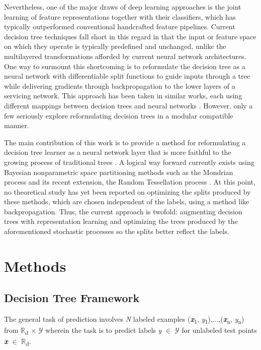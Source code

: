 \documentclass[a4paper,11pt,final]{article}
\begin{document}
Nevertheless, one of the major draws of deep learning approaches is the joint learning of feature representations together with their classifiers, which has typically outperformed conventional handcrafted feature pipelines. Current decision tree techniques fall short in this regard in that the input or feature space on which they operate is typically predefined and unchanged, unlike the multilayered transformations afforded by current neural network architectures. One way to surmount this shortcoming is to reformulate the decision tree as a neural network with differentiable split functions to guide inputs through a tree while delivering gradients through backpropagation to the lower layers of a servicing network. This approach has been taken in similar works, each using different mappings between decision trees and neural networks \cite{kontschieder2015deep, suarez1999globally, 2016arXiv160407143B}. However, only a few seriously explore reformulating decision trees in a modular compatible manner.

The main contribution of this work is to provide a method for reformulating a decision tree learner as a neural network layer that is more faithful to the growing process of traditional trees \cite{pmlr-v97-tanno19a}. A logical way forward currently exists using Bayesian nonparametric space partitioning methods such as the Mondrian process and its recent extension, the Random Tessellation process \cite{2014arXiv1406.2673L, 2019arXiv190605440G}. At this point, no theoretical study has yet been reported on optimizing the splits produced by these methods, which are chosen independent of the labels, using a method like backpropagation. Thus, the current approach is twofold: augmenting decision trees with representation learning and optimizing the trees produced by the aforementioned stochastic processes so the splits better reflect the labels.

\section{Methods}

\subsection{Decision Tree Framework}

The general task of prediction involves \textit{N} labeled examples (\textit{\textbf{x}}\textsubscript{1}, \textit{y}\textsubscript{1}),...,(\textit{\textbf{x}}\textsubscript{n}, \textit{y}\textsubscript{n}) from $\mathbb{R}$\textsubscript{d} $\times$ $\mathcal{Y}$ wherein the task is to predict labels \textit{y} $\in$
$\mathcal{Y}$ for unlabeled test points \textit{\textbf{x}} $\in$ $\mathbb{R}$\textsubscript{d}.
\end{document}
